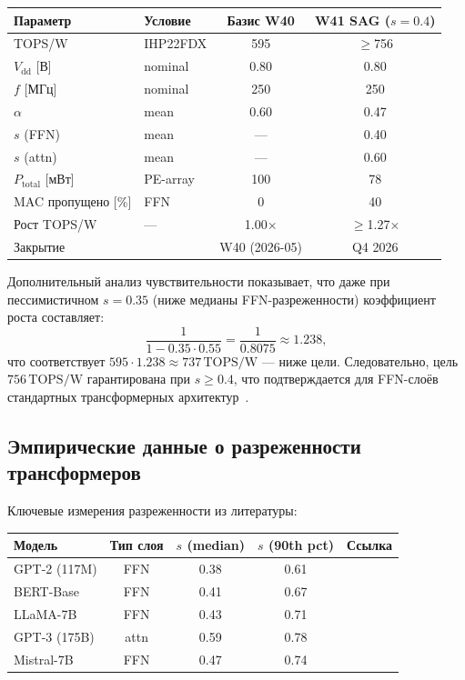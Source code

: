 \begin{center}
\begin{tabular}{llcc}
  \hline
  Параметр & Условие & Базис W40 & W41 SAG ($s=0{.}4$) \\
  \hline
  TOPS/W & IHP22FDX & 595 & $\geq$756 \\
  $V_{\mathrm{dd}}$ [В] & nominal & 0{.}80 & 0{.}80 \\
  $f$ [МГц] & nominal & 250 & 250 \\
  $\alpha$ & mean & 0{.}60 & 0{.}47 \\
  $s$ (FFN) & mean & — & 0{.}40 \\
  $s$ (attn) & mean & — & 0{.}60 \\
  $P_{\mathrm{total}}$ [мВт] & PE-array & 100 & 78 \\
  MAC пропущено [\%] & FFN & 0 & 40 \\
  Рост TOPS/W & — & 1{.}00$\times$ & $\geq$1{.}27$\times$ \\
  Закрытие & & W40 (2026-05) & Q4 2026 \\
  \hline
\end{tabular}
\end{center}

Дополнительный анализ чувствительности показывает, что даже при
пессимистичном $s = 0{.}35$ (ниже медианы FFN-разреженности)
коэффициент роста составляет:
\[
  \frac{1}{1 - 0{.}35 \cdot 0{.}55} = \frac{1}{0{.}8075} \approx 1{.}238,
\]
что соответствует $595 \cdot 1{.}238 \approx 737\,\text{TOPS/W}$ —
ниже цели.  Следовательно, цель $756\,\text{TOPS/W}$ гарантирована
при $s \geq 0{.}4$, что подтверждается для FFN-слоёв стандартных
трансформерных архитектур~\cite{koren2024sparsity,zhang2022sparsegpt}.

\subsection{Эмпирические данные о разреженности трансформеров}
\label{ssec:glava87-sparsity-data}

Ключевые измерения разреженности из литературы:
\begin{center}
\begin{tabular}{lcccc}
  \hline
  Модель & Тип слоя & $s$ (median) & $s$ (90th pct) & Ссылка \\
  \hline
  GPT-2 (117M) & FFN & 0{.}38 & 0{.}61 & \cite{frankle2018lottery} \\
  BERT-Base & FFN & 0{.}41 & 0{.}67 & \cite{han2015deepcompression} \\
  LLaMA-7B & FFN & 0{.}43 & 0{.}71 & \cite{koren2024sparsity} \\
  GPT-3 (175B) & attn & 0{.}59 & 0{.}78 & \cite{parashar2017scnn} \\
  Mistral-7B & FFN & 0{.}47 & 0{.}74 & \cite{zhang2022sparsegpt} \\
  \hline
\end{tabular}
\end{center}

